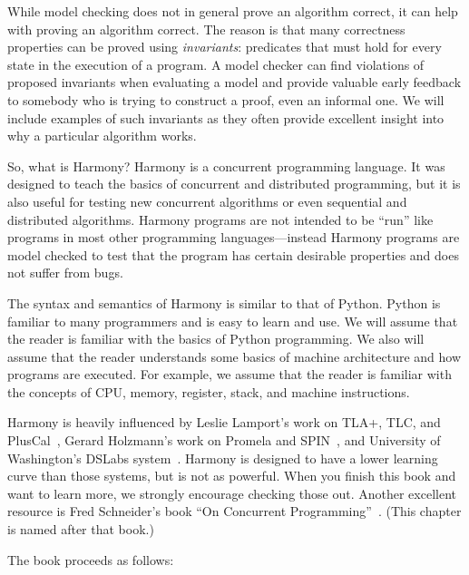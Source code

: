 \documentclass{report}
\begin{document}
%

While model checking does not in general prove an algorithm correct,
it can help with proving an algorithm correct.
The reason is that many correctness properties can be proved using
\emph{invariants}:
%
predicates that must hold for every state in the
execution of a program.  A model checker can find violations of
proposed invariants when evaluating a model and provide valuable early
feedback to somebody who is trying to construct a proof, even an
informal one.
We will include examples
of such invariants as they often provide excellent insight into
why a particular algorithm works.

So, what is Harmony?
Harmony is a concurrent programming language.  It was designed to teach
the basics of concurrent and distributed programming, but it is also useful for
testing new concurrent algorithms or even sequential and distributed
algorithms.  Harmony programs are not intended to be ``run'' like programs
in most other programming languages---instead Harmony programs are
model checked to test that the program has certain desirable
properties and does not suffer from bugs.

The syntax and semantics of Harmony is similar to that of Python.
Python is familiar to many programmers and is easy to learn and
use.  We will assume that the reader is familiar with the basics
of Python programming.  We also will assume that the reader
understands some basics of machine architecture and how programs
are executed.  For example, we assume that the reader is familiar
with the concepts of CPU, memory, register, stack, and machine
instructions.

Harmony is heavily influenced by Leslie Lamport's work on
TLA+, TLC, and PlusCal~\cite{Lamport02, Lamport09},
Gerard Holzmann's work on Promela and SPIN~\cite{SPIN},
and University of Washington's DSLabs system~\cite{MWA19}.
Harmony is designed to have a lower learning curve than those
systems, but is not as powerful.  When you finish this book
and want to learn more, we strongly encourage checking
those out.
Another excellent resource is Fred Schneider's book ``On
Concurrent Programming''~\cite{Schneider97}.
(This chapter is named after that book.)

The book proceeds as follows:
\end{document}
